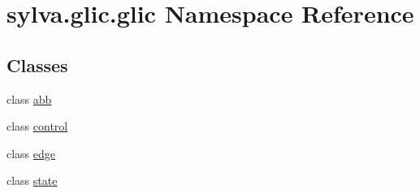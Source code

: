 \hypertarget{namespacesylva_1_1glic_1_1glic}{}\section{sylva.\+glic.\+glic Namespace Reference}
\label{namespacesylva_1_1glic_1_1glic}
\subsection*{Classes}
\begin{DoxyCompactItemize}
\item 
class \hyperlink{classsylva_1_1glic_1_1glic_1_1abb}{abb}
\item 
class \hyperlink{classsylva_1_1glic_1_1glic_1_1control}{control}
\item 
class \hyperlink{classsylva_1_1glic_1_1glic_1_1edge}{edge}
\item 
class \hyperlink{classsylva_1_1glic_1_1glic_1_1state}{state}
\end{DoxyCompactItemize}
